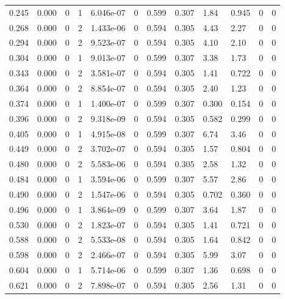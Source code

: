 \documentclass[preview]{standalone}
\begin{document}
{{\begin{tabular}{L{1.2cm}C{1.2cm} C{0.3cm}C{0.5cm} C{1.4cm}C{1.4cm} C{1.4cm}C{1.4cm} C{1.6cm}C{1.6cm} C{1.6cm}C{1.6cm}}
  0.245  &  0.000  & 0     &  1 &  6.046e-07  & 0  &  0.599&   0.307& 1.84 & 0.945   &  0 & 0  \\ 
  0.268  &  0.000  & 0     &  2 &  1.433e-06  & 0  &  0.594&   0.305& 4.43 & 2.27   &  0 & 0  \\ 
  0.294  &  0.000  & 0     &  2 &  9.523e-07  & 0  &  0.594&   0.305& 4.10 & 2.10   &  0 & 0  \\ 
  0.304  &  0.000  & 0     &  1 &  9.013e-07  & 0  &  0.599&   0.307& 3.38 & 1.73   &  0 & 0  \\ 
  0.343  &  0.000  & 0     &  2 &  3.581e-07  & 0  &  0.594&   0.305& 1.41 & 0.722   &  0 & 0  \\ 
  0.364  &  0.000  & 0     &  2 &  8.854e-07  & 0  &  0.594&   0.305& 2.40 & 1.23   &  0 & 0  \\ 
  0.374  &  0.000  & 0     &  1 &  1.400e-07  & 0  &  0.599&   0.307& 0.300 & 0.154   &  0 & 0  \\ 
  0.396  &  0.000  & 0     &  2 &  9.318e-09  & 0  &  0.594&   0.305& 0.582 & 0.299   &  0 & 0  \\ 
  0.405  &  0.000  & 0     &  1 &  4.915e-08  & 0  &  0.599&   0.307& 6.74 & 3.46   &  0 & 0  \\ 
  0.449  &  0.000  & 0     &  2 &  3.702e-07  & 0  &  0.594&   0.305& 1.57 & 0.804   &  0 & 0  \\ 
  0.480  &  0.000  & 0     &  2 &  5.583e-06  & 0  &  0.594&   0.305& 2.58 & 1.32   &  0 & 0  \\ 
  0.484  &  0.000  & 0     &  1 &  3.594e-06  & 0  &  0.599&   0.307& 5.57 & 2.86   &  0 & 0  \\ 
  0.490  &  0.000  & 0     &  2 &  1.547e-06  & 0  &  0.594&   0.305& 0.702 & 0.360   &  0 & 0  \\ 
  0.496  &  0.000  & 0     &  1 &  3.864e-09  & 0  &  0.599&   0.307& 3.64 & 1.87   &  0 & 0  \\ 
  0.530  &  0.000  & 0     &  2 &  1.823e-07  & 0  &  0.594&   0.305& 1.41 & 0.721   &  0 & 0  \\ 
  0.588  &  0.000  & 0     &  2 &  5.533e-08  & 0  &  0.594&   0.305& 1.64 & 0.842   &  0 & 0  \\ 
  0.598  &  0.000  & 0     &  2 &  2.466e-07  & 0  &  0.594&   0.305& 5.99 & 3.07   &  0 & 0  \\ 
  0.604  &  0.000  & 0     &  1 &  5.714e-06  & 0  &  0.599&   0.307& 1.36 & 0.698   &  0 & 0  \\ 
  0.621  &  0.000  & 0     &  2 &  7.898e-07  & 0  &  0.594&   0.305& 2.56 & 1.31   &  0 & 0  \\ 

\end{tabular}}}
\end{document}
